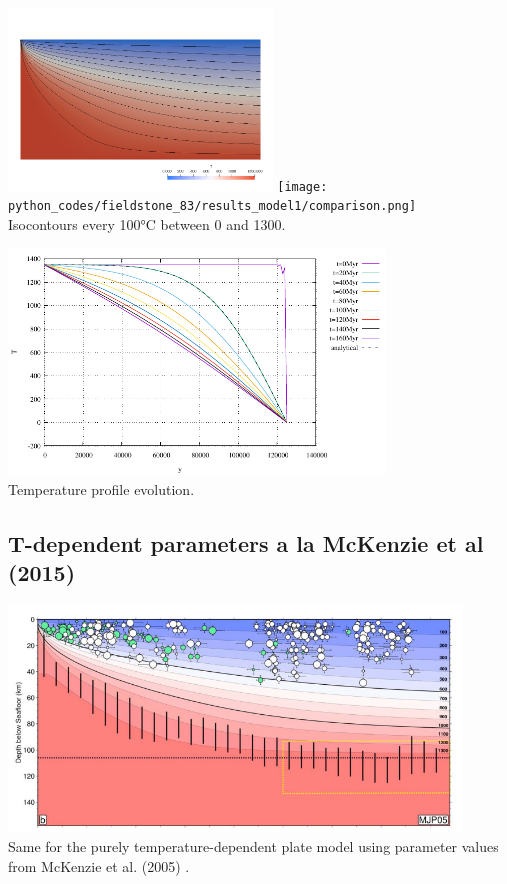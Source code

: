 \begin{center}
\includegraphics[width=7cm]{python_codes/fieldstone_83/results_model1/T.png}
\texttt{[image: python\_codes/fieldstone\_83/results\_model1/comparison.png]}\\
{\captionfont Isocontours every 100$\si{\celsius}$ between 0 and 1300.}
\end{center}

\begin{center}
\includegraphics[width=10cm]{python_codes/fieldstone_83/results_model1/Tprofiles}\\
{\captionfont Temperature profile evolution.} 
\end{center}



\subsection*{T-dependent parameters a la McKenzie et al (2015)}

\begin{center}
\includegraphics[width=12cm]{python_codes/fieldstone_83/images/rihc18b}\\
{\captionfont Same for the purely temperature-dependent plate model using parameter values from
McKenzie et al. (2005) \cite{mcjp05}.}
\end{center}

